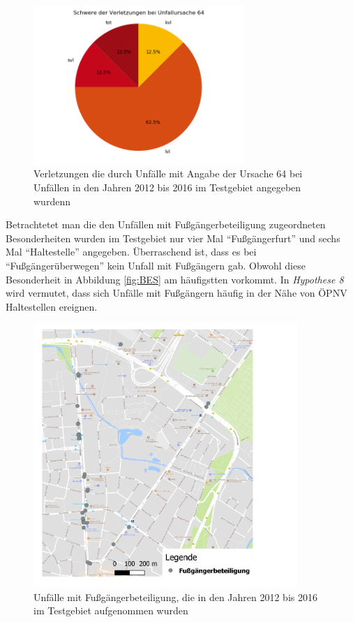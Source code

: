 \begin{savenotes}
	\begin{figure}[H]
		\centering
		\includegraphics[width=8cm,height=6cm]{figures/Urs64}
		\caption[Verletzungen die durch Unfälle mit Angabe der Ursache 64 bei Unfällen in den Jahren 2012 bis 2016 im Testgebiet angegeben wurden]{Verletzungen die durch Unfälle mit Angabe der Ursache 64 bei Unfällen in den Jahren 2012 bis 2016 im Testgebiet angegeben wurdenn}\label{fig:Verletzungen_Urs64}
	\end{figure}
\end{savenotes}


Betrachtetet man die den Unfällen mit Fußgängerbeteiligung zugeordneten Besonderheiten wurden im Testgebiet nur vier Mal \enquote{Fußgängerfurt} und sechs Mal \enquote{Haltestelle} angegeben. Überraschend ist, dass es bei \enquote{Fußgängerüberwegen} kein Unfall mit Fußgängern gab. Obwohl diese Besonderheit in Abbildung \ref{fig:BES} am häufigstten vorkommt. In \textit{Hypothese 8} wird vermutet, dass sich Unfälle mit Fußgängern häufig in der Nähe von ÖPNV Haltestellen ereignen.

\begin{savenotes}
	\begin{figure}[H]
		\centering
		\includegraphics[width=10cm,height=10cm]{figures/map_fussgaenger}
		\caption[Unfälle mit Fußgängerbeteiligung, die in den Jahren 2012 bis 2016 im Testgebiet aufgenommen wurden]{Unfälle mit Fußgängerbeteiligung, die in den Jahren 2012 bis 2016 im Testgebiet aufgenommen wurden}\label{fig:map_fussganeger}
	\end{figure}
\end{savenotes}

